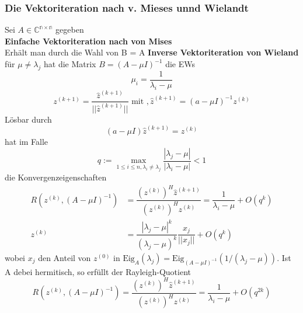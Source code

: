 \documentclass[
	ngerman,
	accentcolor=9c,%
	type=intern,
	marginpar=false
	]{tudapub}
\begin{document}
            \subsubsection{Die Vektoriteration nach v. Mieses unnd Wielandt}
                Sei $A\in \mathbb{C^{n\times n}}$ gegeben \\
                \textbf{Einfache Vektoriteration nach von Mises}\\
                Erhält man durch die Wahl von B = A
                \textbf{Inverse Vektoriteration von Wieland}
                für $\mu \not = \lambda_j$ hat die Matrix $B=(A-\mu I)^{-1}$ die EWs
                \begin{equation*}
                    \mu_i = \dfrac{1}{\lambda_i - \mu}
                \end{equation*}
                \begin{equation*}
                    z^{(k+1)} = \dfrac{\hat{z}^{(k+1)}}{||\hat{z}^{(k+1)}||} \mbox{ mit },
                    \hat{z}^{(k+1)}=(a-\mu I)^{-1}z^{(k)}
                \end{equation*}                
                Lösbar durch 
                \begin{equation*}
                    (a-\mu I)\hat{z}^{(k+1)} = z^{(k)}
                \end{equation*}
                hat im Falle
                \begin{equation*}
                    q := \max_{1 \leq i \leq n, \lambda_i \not = \lambda_j} \dfrac{|\lambda_j- \mu|}{|\lambda_i- \mu|}<1
                \end{equation*}
                die Konvergenzeigenschaften
                \begin{align*}
                    R(z^{(k)}, (A - \mu I)^{-1}) &= \dfrac{(z^{(k)})^H\hat{z}^{(k+1)}}{(z^{(k)})^Hz^{(k)}} = \dfrac{1}{\lambda_i - \mu} + O(q^k)\\
                    z^{(k)} &= \dfrac{|\lambda_j-\mu|^k}{(\lambda_j-\mu)^k}\dfrac{x_j}{||x_j||}+O(q^k)
                \end{align*}
                wobei $x_j$ den Anteil von $z^{(0)}$ in $\text{Eig}_A(\lambda_j) = \text{Eig}_{(A-\mu I)^{-1}}(1/(\lambda_j - \mu))$.
                Ist A debei hermitisch, so erfüllt der Rayleigh-Quotient
                \begin{equation*}
                    R(z^{(k)}, (A - \mu I)^{-1}) = \dfrac{(z^{(k)})^H\hat{z}^{(k+1)}}{(z^{(k)})^Hz^{(k)}} = \dfrac{1}{\lambda_i - \mu} + O(q^{2k})
                \end{equation*}
\end{document}
